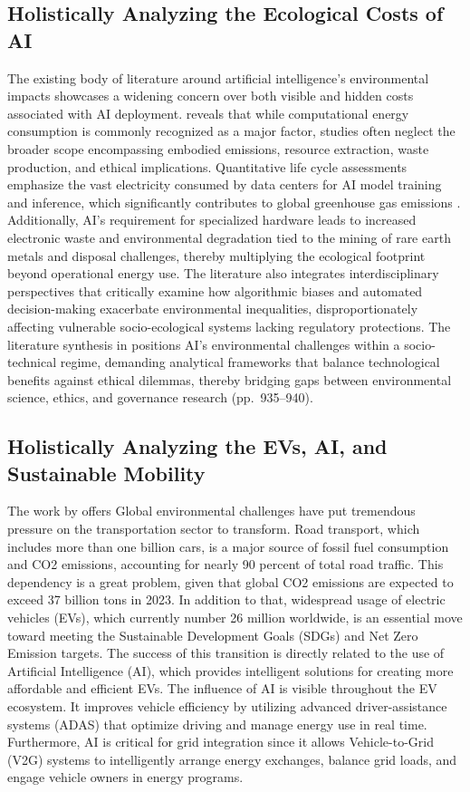 \documentclass[a4paper, 12pt]{article}
\begin{document}
\subsection{Holistically Analyzing the Ecological Costs of AI}
The existing body of literature around artificial intelligence's environmental impacts showcases a widening concern over both visible and hidden costs associated with AI deployment. \citet{Zhuk2023} reveals that while computational energy consumption is commonly recognized as a major factor, studies often neglect the broader scope encompassing embodied emissions, resource extraction, waste production, and ethical implications. Quantitative life cycle assessments emphasize the vast electricity consumed by data centers for AI model training and inference, which significantly contributes to global greenhouse gas emissions \citep{Zhuk2023}. Additionally, AI's requirement for specialized hardware leads to increased electronic waste and environmental degradation tied to the mining of rare earth metals and disposal challenges, thereby multiplying the ecological footprint beyond operational energy use. The literature also integrates interdisciplinary perspectives that critically examine how algorithmic biases and automated decision-making exacerbate environmental inequalities, disproportionately affecting vulnerable socio-ecological systems lacking regulatory protections. The literature synthesis in \citet{Zhuk2023} positions AI's environmental challenges within a socio-technical regime, demanding analytical frameworks that balance technological benefits against ethical dilemmas, thereby bridging gaps between environmental science, ethics, and governance research (pp.~935--940).
\subsection{Holistically Analyzing the EVs, AI, and Sustainable Mobility}
The work by \citet{M.rauf2024} offers Global environmental challenges have put tremendous pressure on the transportation sector to transform.  Road transport, which includes more than one billion cars, is a major source of fossil fuel consumption and CO2 emissions, accounting for nearly 90 percent of total road traffic. This dependency is a great problem, given that global CO2 emissions are expected to exceed 37 billion tons in 2023. In addition to that, widespread usage of electric vehicles (EVs), which currently number 26 million worldwide, is an essential move toward meeting the Sustainable Development Goals (SDGs) and Net Zero Emission targets.  The success of this transition is directly related to the use of Artificial Intelligence (AI), which provides intelligent solutions for creating more affordable and efficient EVs. The influence of AI is visible throughout the EV ecosystem. It improves vehicle efficiency by utilizing advanced driver-assistance systems (ADAS) that optimize driving and manage energy use in real time.  Furthermore, AI is critical for grid integration since it allows Vehicle-to-Grid (V2G) systems to intelligently arrange energy exchanges, balance grid loads, and engage vehicle owners in energy programs.
\end{document}

